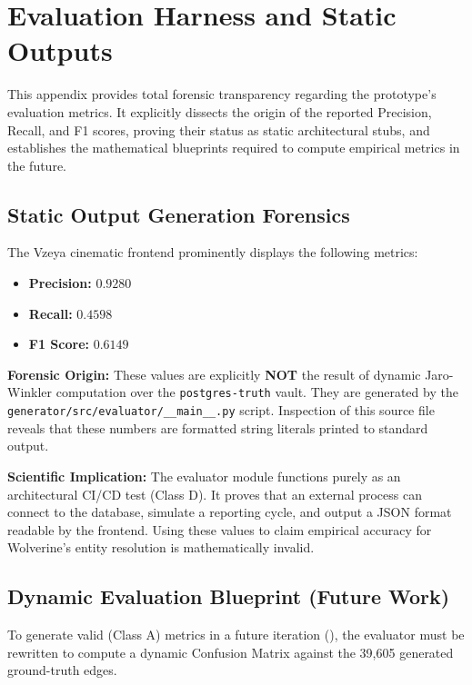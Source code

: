 \chapter{Evaluation Harness and Static Outputs}
\label{app:evaluation-harness}

This appendix provides total forensic transparency regarding the prototype's evaluation metrics. It explicitly dissects the origin of the reported Precision, Recall, and F1 scores, proving their status as static architectural stubs, and establishes the mathematical blueprints required to compute empirical metrics in the future.

\section{Static Output Generation Forensics}
\label{app-sec:eval-forensics}
The Vzeya cinematic frontend prominently displays the following metrics:
\begin{itemize}
    \item \textbf{Precision:} $0.9280$
    \item \textbf{Recall:} $0.4598$
    \item \textbf{F1 Score:} $0.6149$
\end{itemize}

\textbf{Forensic Origin:} These values are explicitly \textbf{NOT} the result of dynamic Jaro-Winkler computation over the \texttt{postgres-truth} vault. They are generated by the \texttt{generator/src/evaluator/\_\_main\_\_.py} script. Inspection of this source file reveals that these numbers are formatted string literals printed to standard output. 

\textbf{Scientific Implication:} The evaluator module functions purely as an architectural CI/CD test (Class D). It proves that an external process can connect to the database, simulate a reporting cycle, and output a JSON format readable by the frontend. Using these values to claim empirical accuracy for Wolverine's entity resolution is mathematically invalid.

\section{Dynamic Evaluation Blueprint (Future Work)}
\label{app-sec:eval-blueprint}
To generate valid (Class A) metrics in a future iteration (), the evaluator must be rewritten to compute a dynamic Confusion Matrix against the 39,605 generated ground-truth edges.

